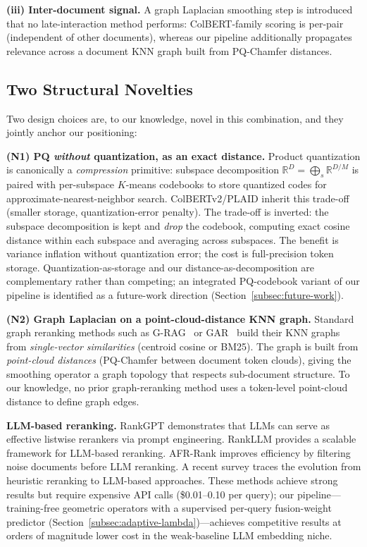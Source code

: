 \documentclass[review,1p]{elsarticle}
\newcommand{\R}{\mathbb{R}}
\begin{document}
\textbf{(iii) Inter-document signal.} A graph Laplacian smoothing step is introduced that no late-interaction method performs: ColBERT-family scoring is per-pair (independent of other documents), whereas our pipeline additionally propagates relevance across a document KNN graph built from PQ-Chamfer distances.

\subsection{Two Structural Novelties}
\label{subsec:related-novelties}

Two design choices are, to our knowledge, novel in this combination, and they jointly anchor our positioning:

\textbf{(N1) PQ \emph{without} quantization, as an exact distance.} Product quantization \citep{jegou2011pq} is canonically a \emph{compression} primitive: subspace decomposition $\R^{D} = \bigoplus_s \R^{D/M}$ is paired with per-subspace $K$-means codebooks to store quantized codes for approximate-nearest-neighbor search. ColBERTv2/PLAID inherit this trade-off (smaller storage, quantization-error penalty). The trade-off is inverted: the subspace decomposition is kept and \emph{drop} the codebook, computing exact cosine distance within each subspace and averaging across subspaces. The benefit is variance inflation without quantization error; the cost is full-precision token storage. Quantization-as-storage and our distance-as-decomposition are complementary rather than competing; an integrated PQ-codebook variant of our pipeline is identified as a future-work direction (Section~\ref{subsec:future-work}).

\textbf{(N2) Graph Laplacian on a point-cloud-distance KNN graph.} Standard graph reranking methods such as G-RAG~\citep{glass2024grag} or GAR~\citep{macavaney2022gar} build their KNN graphs from \emph{single-vector similarities} (centroid cosine or BM25). The graph is built from \emph{point-cloud distances} (PQ-Chamfer between document token clouds), giving the smoothing operator a graph topology that respects sub-document structure. To our knowledge, no prior graph-reranking method uses a token-level point-cloud distance to define graph edges.

\textbf{LLM-based reranking.} RankGPT \citep{sun2024rankgpt} demonstrates that LLMs can serve as effective listwise rerankers via prompt engineering. RankLLM \citep{pradeep2025rankllm} provides a scalable framework for LLM-based reranking. AFR-Rank \citep{afrrank2025} improves efficiency by filtering noise documents before LLM reranking. A recent survey \citep{li2025reranking_survey} traces the evolution from heuristic reranking to LLM-based approaches. These methods achieve strong results but require expensive API calls (\$0.01--0.10 per query); our pipeline---training-free geometric operators with a supervised per-query fusion-weight predictor (Section~\ref{subsec:adaptive-lambda})---achieves competitive results at orders of magnitude lower cost in the weak-baseline LLM embedding niche.
\end{document}
